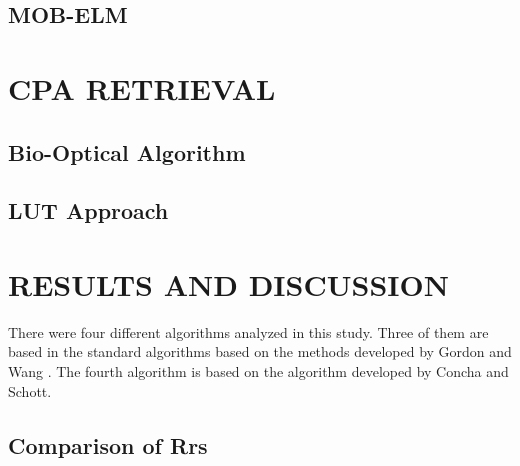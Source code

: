 \documentclass[]{spie}  %
\begin{document}
\subsection{MOB-ELM}


\section{CPA RETRIEVAL}
\subsection{Bio-Optical Algorithm}
\subsection{LUT Approach}
\section{RESULTS AND DISCUSSION}
\label{sec:results}  %

There were four different algorithms analyzed in this study. Three of them are based in the standard algorithms based on the methods developed by Gordon and Wang \cite{Gordon:1994}. The fourth algorithm is based on the algorithm developed by Concha and Schott\cite{Concha2014SPIE}.
\subsection{Comparison of Rrs}

\end{document}
